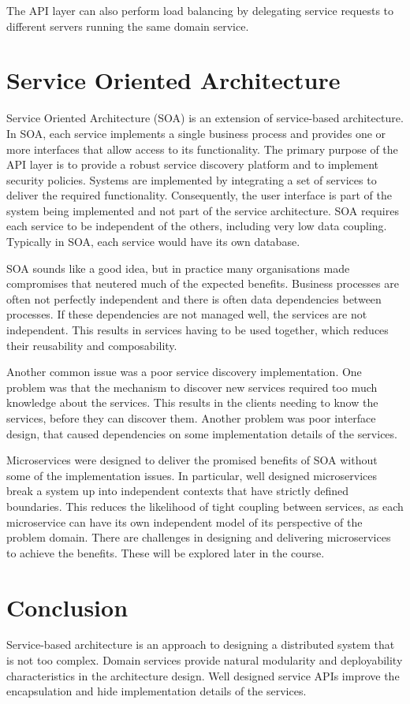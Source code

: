 The API layer can also perform load balancing by delegating service requests to different servers running the same domain service.


\section{Service Oriented Architecture}

Service Oriented Architecture (SOA) is an extension of service-based architecture.
In SOA, each service implements a single business process and provides one or more interfaces that allow access to its functionality.
The primary purpose of the API layer is to provide a robust service discovery platform and to implement security policies.
Systems are implemented by integrating a set of services to deliver the required functionality.
Consequently, the user interface is part of the system being implemented and not part of the service architecture.
SOA requires each service to be independent of the others, including very low data coupling.
Typically in SOA, each service would have its own database.

SOA sounds like a good idea, but in practice many organisations made compromises that neutered much of the expected benefits.
Business processes are often not perfectly independent and there is often data dependencies between processes.
If these dependencies are not managed well, the services are not independent.
This results in services having to be used together, which reduces their reusability and composability.

Another common issue was a poor service discovery implementation.
One problem was that the mechanism to discover new services required too much knowledge about the services.
This results in the clients needing to know the services, before they can discover them.
Another problem was poor interface design, that caused dependencies on some implementation details of the services.

Microservices were designed to deliver the promised benefits of SOA without some of the implementation issues.
In particular, well designed microservices break a system up into independent contexts that have strictly defined boundaries.
This reduces the likelihood of tight coupling between services,
as each microservice can have its own independent model of its perspective of the problem domain.
There are challenges in designing and delivering microservices to achieve the benefits.
These will be explored later in the course.


\section{Conclusion}

Service-based architecture is an approach to designing a distributed system that is not too complex.
Domain services provide natural modularity and deployability characteristics in the architecture design.
Well designed service APIs improve the encapsulation and hide implementation details of the services.
